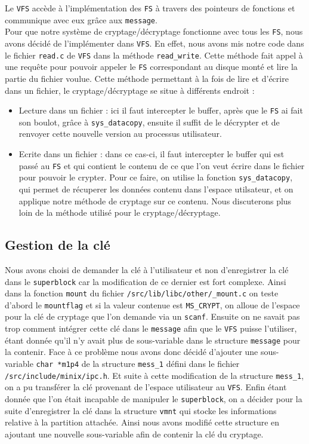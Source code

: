 \documentclass[10pt, onecolumn] {IEEEtran}
\begin{document}
Le \texttt{VFS} accède à l'implémentation des \texttt{FS} à travers des pointeurs de fonctions et communique avec eux grâce aux \texttt{message}. \\

Pour que notre système de cryptage/décryptage fonctionne avec tous les \texttt{FS}, nous avons décidé de l'implémenter dans \texttt{VFS}. En effet, nous avons mis notre code dans le fichier \texttt{read.c} de \texttt{VFS} dans la méthode \texttt{read\_write}. Cette méthode fait appel à une requête pour pouvoir appeler le  \texttt{FS} correspondant au disque monté et lire la partie du fichier voulue. Cette méthode permettant à la fois de lire et d'écrire dans un fichier, le cryptage/décryptage se situe à différents endroit :

\begin{itemize}
\item Lecture dans un fichier : ici il faut intercepter le buffer, après que le \texttt{FS} ai fait son boulot, grâce à \texttt{sys\_datacopy}, ensuite il suffit de le décrypter et de renvoyer cette nouvelle version au processus utilisateur.
\item Ecrite dans un fichier : dans ce cas-ci, il faut intercepter le buffer qui est passé au \texttt{FS} et qui contient le contenu de ce que l'on veut écrire dans le fichier pour pouvoir le crypter. Pour ce faire, on utilise la fonction \texttt{sys\_datacopy}, qui permet de récuperer les données contenu dans l'espace utilsateur, et on applique notre méthode de cryptage sur ce contenu. Nous discuterons plus loin de la méthode utilisé pour le cryptage/décryptage.
\end{itemize}

\subsection{Gestion de la clé}

Nous avons choisi de demander la clé à l'utilisateur et non d'enregistrer la clé dans le \texttt{superblock} car la modification de ce dernier est fort complexe. Ainsi dans la fonction \texttt{mount} du fichier \texttt{/src/lib/libc/other/\_mount.c} on teste d'abord le \texttt{mountflag} et si la valeur contenue est \texttt{MS\_CRYPT}, on alloue de l'espace pour la clé de cryptage que l'on demande via un \texttt{scanf}. Ensuite on ne savait pas trop comment intégrer cette clé dans le \texttt{message} afin que le \texttt{VFS} puisse l'utiliser, étant donnée qu'il n'y avait plus de sous-variable dans le structure \texttt{message} pour la contenir. Face à ce problème nous avons donc décidé d'ajouter une sous-variable \texttt{char *m1p4} de la structure \texttt{mess\_1} défini dans le fichier \texttt{/src/include/minix/ipc.h}. Et suite à cette modification de la structure \texttt{mess\_1}, on a pu transférer la clé provenant de l'espace utilisateur au \texttt{VFS}. Enfin étant donnée que l'on était incapable de manipuler le \texttt{superblock}, on a décider pour la suite d'enregistrer la clé dans la structure \texttt{vmnt} qui stocke les informations relative à la partition attachée. Ainsi nous avons modifié cette structure en ajoutant une nouvelle sous-variable afin de contenir la clé du cryptage.     
\end{document}
